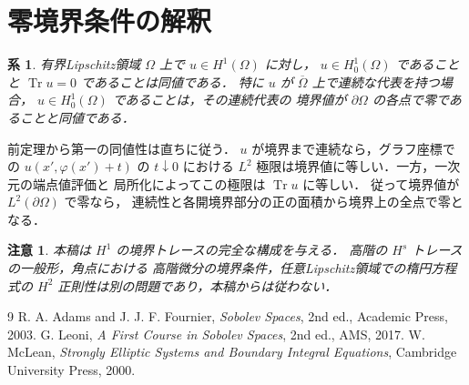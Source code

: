 \documentclass[a5paper,10pt,onecolumn]{jsarticle}
\makeatletter
\theoremstyle{mathnotetheorem}
\newtheorem{corollary}[theorem]{系}
\newtheorem{remark}[theorem]{注意}
\renewcommand{\proofname}{証明}
\renewenvironment{proof}[1][\proofname]{%
  \par\pushQED{\qed}\normalfont\topsep4\p@\@plus2\p@\relax
  \trivlist\item[\hskip\labelsep\bfseries #1]\ignorespaces
}{\popQED\endtrivlist\@endpefalse}
\makeatother
\begin{document}
\section{零境界条件の解釈}
\begin{corollary}
有界Lipschitz領域 $\Omega$ 上で $u\in H^1(\Omega)$ に対し，
$u\in H_0^1(\Omega)$ であることと
$\operatorname{Tr}u=0$ であることは同値である．
特に $u$ が $\overline\Omega$ 上で連続な代表を持つ場合，
$u\in H_0^1(\Omega)$ であることは，その連続代表の
境界値が $\partial\Omega$ の各点で零であることと同値である．
\end{corollary}
\begin{proof}
前定理から第一の同値性は直ちに従う．
$u$ が境界まで連続なら，グラフ座標での
$u(x',\varphi(x')+t)$ の $t\downarrow0$ における
$L^2$ 極限は境界値に等しい．一方，一次元の端点値評価と
局所化によってこの極限は $\operatorname{Tr}u$ に等しい．
従って境界値が $L^2(\partial\Omega)$ で零なら，
連続性と各開境界部分の正の面積から境界上の全点で零となる．
\end{proof}

\begin{remark}
本稿は $H^1$ の境界トレースの完全な構成を与える．
高階の $H^s$ トレースの一般形，角点における
高階微分の境界条件，任意Lipschitz領域での楕円方程式の
$H^2$ 正則性は別の問題であり，本稿からは従わない．
\end{remark}

\begin{thebibliography}{9}
 R. A. Adams and J. J. F. Fournier,
 \emph{Sobolev Spaces}, 2nd ed., Academic Press, 2003.
 G. Leoni, \emph{A First Course in Sobolev Spaces},
 2nd ed., AMS, 2017.
 W. McLean,
 \emph{Strongly Elliptic Systems and Boundary Integral Equations},
 Cambridge University Press, 2000.
\end{thebibliography}
\end{document}

